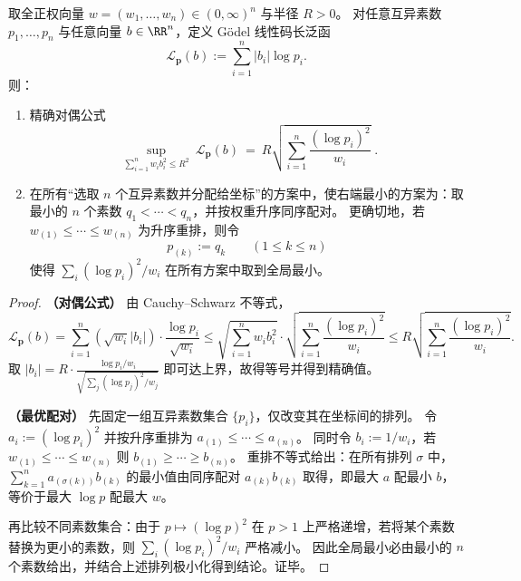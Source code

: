 \begin{theorem}\label{thm:fold-godel-ellipsoid-duality-optimal-pairing}
取全正权向量 \(w=(w_1,\dots,w_n)\in(0,\infty)^n\) 与半径 \(R>0\)。
对任意互异素数 \(p_1,\dots,p_n\) 与任意向量 \(b\in\RR^n\)，定义 Gödel 线性码长泛函
\[
\mathcal L_{\boldsymbol p}(b):=\sum_{i=1}^n |b_i|\log p_i.
\]
则：
\begin{enumerate}
  \item 精确对偶公式
  \[
  \boxed{\;
  \sup_{\sum_{i=1}^n w_i b_i^2\le R^2}\ \mathcal L_{\boldsymbol p}(b)
  \ =\ R\sqrt{\sum_{i=1}^n\frac{(\log p_i)^2}{w_i}}\; }.
  \]
  \item 在所有“选取 \(n\) 个互异素数并分配给坐标”的方案中，使右端最小的方案为：取最小的 \(n\) 个素数 \(q_1<\cdots<q_n\)，并按权重升序同序配对。
  更确切地，若 \(w_{(1)}\le\cdots\le w_{(n)}\) 为升序重排，则令
  \[
  p_{(k)}:=q_k\qquad(1\le k\le n)
  \]
  使得
  \(
  \sum_i(\log p_i)^2/w_i
  \)
  在所有方案中取到全局最小。
\end{enumerate}
\end{theorem}
\begin{proof}
\textbf{（对偶公式）}
由 Cauchy--Schwarz 不等式，
\[
\mathcal L_{\boldsymbol p}(b)
=\sum_{i=1}^n (\sqrt{w_i}|b_i|)\cdot\frac{\log p_i}{\sqrt{w_i}}
\le
\sqrt{\sum_{i=1}^n w_i b_i^2}\cdot \sqrt{\sum_{i=1}^n\frac{(\log p_i)^2}{w_i}}
\le
R\sqrt{\sum_{i=1}^n\frac{(\log p_i)^2}{w_i}}.
\]
取
\(
|b_i|=R\cdot\frac{\log p_i/w_i}{\sqrt{\sum_j (\log p_j)^2/w_j}}
\)
即可达上界，故得等号并得到精确值。
\par
\textbf{（最优配对）}
先固定一组互异素数集合 \(\{p_i\}\)，仅改变其在坐标间的排列。
令 \(a_i:=(\log p_i)^2\) 并按升序重排为 \(a_{(1)}\le\cdots\le a_{(n)}\)。
同时令 \(b_i:=1/w_i\)，若 \(w_{(1)}\le\cdots\le w_{(n)}\) 则 \(b_{(1)}\ge\cdots\ge b_{(n)}\)。
重排不等式给出：在所有排列 \(\sigma\) 中，
\(
\sum_{k=1}^n a_{(\sigma(k))}b_{(k)}
\)
的最小值由同序配对 \(a_{(k)}b_{(k)}\) 取得，即最大 \(a\) 配最小 \(b\)，等价于最大 \(\log p\) 配最大 \(w\)。
\par
再比较不同素数集合：由于 \(p\mapsto (\log p)^2\) 在 \(p>1\) 上严格递增，若将某个素数替换为更小的素数，则 \(\sum_i(\log p_i)^2/w_i\) 严格减小。
因此全局最小必由最小的 \(n\) 个素数给出，并结合上述排列极小化得到结论。证毕。
\end{proof}

